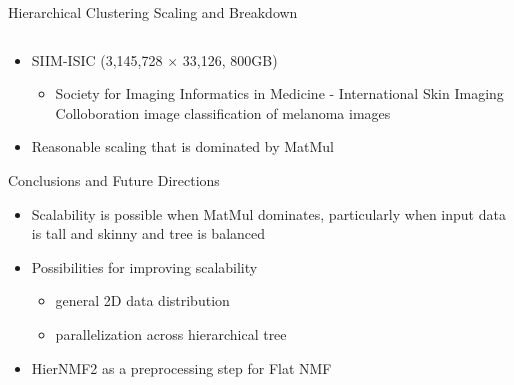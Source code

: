 \documentclass{beamer}
\begin{document}
\begin{frame}{Hierarchical Clustering Scaling and Breakdown}
\begin{columns}
\begin{column}{0.5\textwidth}
        \end{column}
    \end{columns}
    \begin{itemize}
    \small
        \item SIIM-ISIC (3{,}145{,}728 $\times$ 33{,}126, 800GB)
        \begin{itemize}
            \item Society for Imaging Informatics in Medicine - International Skin Imaging Colloboration image classification of melanoma images
        \end{itemize}
        \item Reasonable scaling that is dominated by MatMul
    \end{itemize}
\end{frame}

\begin{frame}{Conclusions and Future Directions}

\begin{itemize}
	\item Scalability is possible when MatMul dominates, particularly when input data is tall and skinny and tree is balanced
	\vfill
	\item Possibilities for improving scalability
	\begin{itemize}
		\item general 2D data distribution
		\item parallelization across hierarchical tree
	\end{itemize}
	\vfill
	\item HierNMF2 as a preprocessing step for Flat NMF
\end{itemize}

\end{frame}
\end{document}
